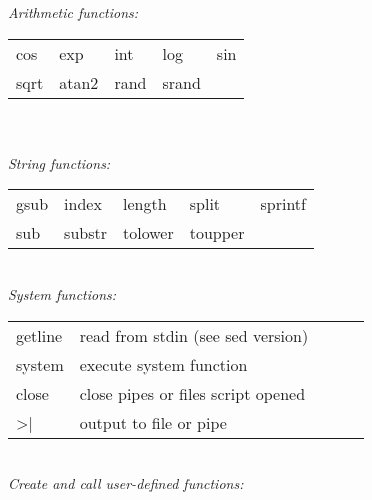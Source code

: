 \textit{Arithmetic functions:}\\
\begin{tabular}{l l l l l}
    cos		&
    exp		&
    int		&
    log		&
    sin		\\	
    sqrt	&
    atan2	&
    rand	&
    srand	&
\end{tabular}\\
\vspace{1mm} \\
\textit{String functions:}\\
\begin{tabular}{l l l l l}
    gsub	&
    index	&
    length	&
    split   &
    sprintf \\
    sub     &
    substr	&
    tolower	&
    toupper	\\
\end{tabular}
\vspace{1mm} \\
\textit{System functions:}\\
\begin{tabular}{l l l l l}
    getline	&	read from stdin (see sed version)	\\
    system	&	execute system function			\\
    close	&	close pipes or files script opened	\\
    >\quad|	&	output to file or pipe 			\\
\end{tabular} 
\vspace{1mm} \\
\textit{Create and call user-defined functions:}\\
\\
\\
\\
\entry{35mm}{\}}{}\\
\\







